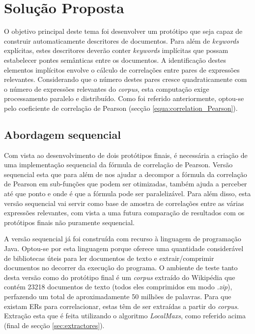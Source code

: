 \chapter{Solução Proposta}
\label{cha:solução_proposta}
O objetivo principal deste tema foi desenvolver um protótipo que seja capaz de construir automaticamente descritores de documentos. Para além de \textit{keywords} explícitas, estes descritores deverão conter \textit{keywords} implícitas que possam estabelecer pontes semânticas entre os documentos. 
A identificação destes elementos implícitos envolve o cálculo de correlações entre pares de expressões relevantes. Considerando que o número destes pares cresce quadraticamente com o número de expressões relevantes do \textit{corpus}, esta computação exige processamento paralelo e distribuído. 
Como foi referido anteriormente, optou-se pelo coeficiente de correlação de Pearson (secção \ref{equa:correlation_Pearson}).

\section{Abordagem sequencial}

Com vista ao desenvolvimento de dois protótipos finais, é necessária a criação de uma implementação sequencial da fórmula de correlação de Pearson. Versão sequencial esta que para além de nos ajudar a decompor a fórmula da correlação de Pearson em sub-funções que podem ser otimizadas, também ajuda a perceber até que ponto e onde é que a fórmula pode ser paralelizável. Para além disso, esta versão sequencial vai servir como  base de amostra de correlações entre as várias expressões relevantes, com vista a uma futura comparação de resultados com os protótipos finais não puramente sequencial.

A versão sequencial já foi construída com recurso à linguagem de programação Java. Optou-se por esta linguagem porque oferece uma quantidade considerável de bibliotecas úteis para ler documentos de texto e extrair/comprimir documentos no decorrer da execução do programa. O ambiente de teste tanto desta versão como do protótipo final é um \textit{corpus} extraído do Wikipédia que contém 23218 documentos de texto (todos eles comprimidos em modo \textit{.zip}), perfazendo um total de aproximadamente 50 milhões de palavras. Para que existam ERs para correlacionar, estas têm de ser extraídas a partir do \textit{corpus}. Extração esta que é feita utilizando o algoritmo \textit{LocalMaxs}, como referido acima (final de secção \ref{sec:extractores}). 

